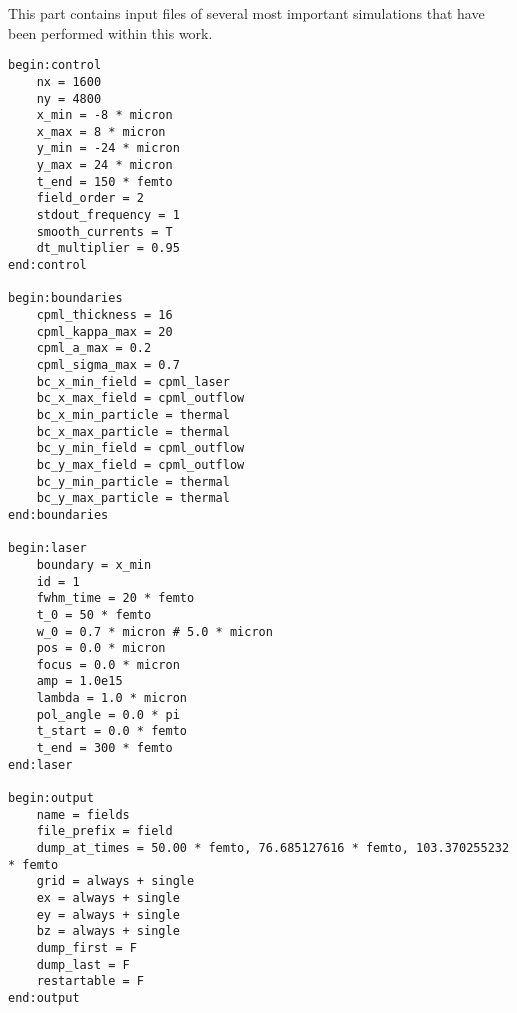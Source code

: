This part contains input files of several most important simulations that have been performed within this work.  

\begin{lstlisting}[style=CXX, caption=test lbcs]
begin:control
	nx = 1600
	ny = 4800
	x_min = -8 * micron
	x_max = 8 * micron
	y_min = -24 * micron
	y_max = 24 * micron
	t_end = 150 * femto
	field_order = 2
	stdout_frequency = 1
	smooth_currents = T
	dt_multiplier = 0.95
end:control

begin:boundaries
	cpml_thickness = 16
	cpml_kappa_max = 20
	cpml_a_max = 0.2
	cpml_sigma_max = 0.7
	bc_x_min_field = cpml_laser
	bc_x_max_field = cpml_outflow
	bc_x_min_particle = thermal
	bc_x_max_particle = thermal
	bc_y_min_field = cpml_outflow
	bc_y_max_field = cpml_outflow
	bc_y_min_particle = thermal
	bc_y_max_particle = thermal
end:boundaries

begin:laser
	boundary = x_min
	id = 1
	fwhm_time = 20 * femto
	t_0 = 50 * femto
	w_0 = 0.7 * micron # 5.0 * micron
	pos = 0.0 * micron
	focus = 0.0 * micron
	amp = 1.0e15
	lambda = 1.0 * micron
	pol_angle = 0.0 * pi
	t_start = 0.0 * femto
	t_end = 300 * femto
end:laser

begin:output
	name = fields
	file_prefix = field
	dump_at_times = 50.00 * femto, 76.685127616 * femto, 103.370255232 * femto
	grid = always + single
	ex = always + single
	ey = always + single
	bz = always + single
	dump_first = F
	dump_last = F
	restartable = F
end:output
\end{lstlisting}

